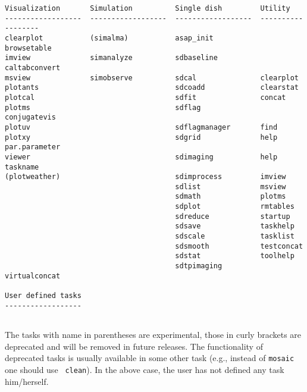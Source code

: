 \begin{verbatim}
Visualization       Simulation          Single dish         Utility           
------------------  ------------------  ------------------  ------------------
clearplot           (simalma)           asap_init           browsetable       
imview              simanalyze          sdbaseline          caltabconvert     
msview              simobserve          sdcal               clearplot         
plotants                                sdcoadd             clearstat         
plotcal                                 sdfit               concat            
plotms                                  sdflag              conjugatevis      
plotuv                                  sdflagmanager       find              
plotxy                                  sdgrid              help par.parameter
viewer                                  sdimaging           help taskname     
(plotweather)                           sdimprocess         imview            
                                        sdlist              msview            
                                        sdmath              plotms            
                                        sdplot              rmtables          
                                        sdreduce            startup           
                                        sdsave              taskhelp          
                                        sdscale             tasklist          
                                        sdsmooth            testconcat        
                                        sdstat              toolhelp          
                                        sdtpimaging         virtualconcat     

User defined tasks
------------------


\end{verbatim}
\normalsize The tasks with name in parentheses are experimental, those
in curly brackets are deprecated and will be removed in future
releases. The functionality of deprecated tasks is usually available
in some other task (e.g., instead of {\tt mosaic} one should use {\tt
  clean}). In the above case, the user has not defined any task
him/herself.

